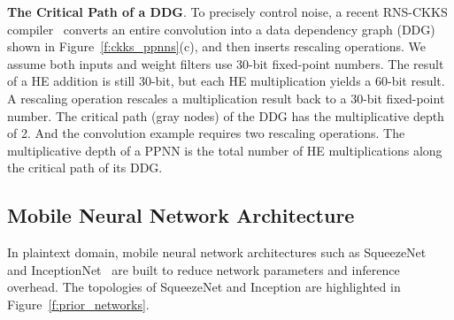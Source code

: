 \documentclass{article}
\begin{document}





\textbf{The Critical Path of a DDG}. To precisely control noise, a recent RNS-CKKS compiler~\cite{Dathathri:PLDI20:EVA} converts an entire convolution into a data dependency graph (DDG) shown in Figure~\ref{f:ckks_ppnns}(c), and then inserts rescaling operations. We assume both inputs and weight filters use 30-bit fixed-point numbers. The result of a HE addition is still 30-bit, but each HE multiplication yields a 60-bit result. A rescaling operation rescales a multiplication result back to a 30-bit fixed-point number. The critical path (gray nodes) of the DDG has the multiplicative depth of 2. And the convolution example requires two rescaling operations. The multiplicative depth of a PPNN is the total number of HE multiplications along the critical path of its DDG.



















\subsection{Mobile Neural Network Architecture}
	
In plaintext domain, mobile neural network architectures such as SqueezeNet~\cite{iandola2016squeezenet} and InceptionNet~\cite{szegedy2016inception} are built to reduce network parameters and inference overhead. The topologies of SqueezeNet and Inception are highlighted in Figure~\ref{f:prior_networks}.
\end{document}
